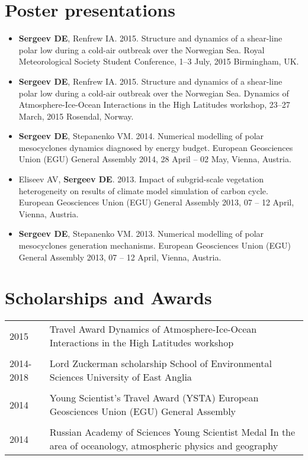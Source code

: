 \documentclass[a4paper,11pt]{article}
\newlength{\mycol}
\begin{document}
\section{Poster presentations}
\begin{itemize}
	\item {\bf Sergeev DE}, Renfrew IA. 2015. Structure and dynamics of a shear-line polar low during a cold-air outbreak over the Norwegian Sea. Royal Meteorological Society Student Conference, 1--3 July, 2015 Birmingham, UK.
    \item {\bf Sergeev DE}, Renfrew IA. 2015. Structure and dynamics of a shear-line polar low during a cold-air outbreak over the Norwegian Sea. Dynamics of Atmosphere-Ice-Ocean Interactions in the High Latitudes workshop, 23--27 March, 2015 Rosendal, Norway.
	\item {\bf Sergeev DE}, Stepanenko VM. 2014. Numerical modelling of polar mesocyclones dynamics diagnosed by energy budget. European Geosciences Union (EGU) General Assembly 2014, 28 April -- 02 May, Vienna, Austria.
	\item Eliseev AV, {\bf Sergeev DE}. 2013. Impact of subgrid-scale vegetation heterogeneity on results of climate model simulation of carbon cycle. European Geosciences Union (EGU) General Assembly 2013, 07 -- 12 April, Vienna, Austria.
	\item {\bf Sergeev DE}, Stepanenko VM. 2013. Numerical modelling of polar mesocyclones generation mechanisms. European Geosciences Union (EGU) General Assembly 2013, 07 -- 12 April, Vienna, Austria.
\end{itemize}

      
\section{Scholarships and Awards}
\begin{tabu} to 
 \textsc{2015} & Travel Award
                  \newline Dynamics of Atmosphere-Ice-Ocean Interactions in the High Latitudes workshop\\
  \\
 \textsc{2014-2018} & Lord Zuckerman scholarship
                    \newline School of Environmental Sciences
                    \newline University of East Anglia \\
  \\
 \textsc{2014} & Young Scientist's Travel Award (YSTA)
                 \newline European Geosciences Union (EGU) General Assembly \\
  \\
 \textsc{2014} & Russian Academy of Sciences Young Scientist Medal
                 \newline In the area of oceanology, atmospheric physics and geography
\end{tabu}
\end{document}
